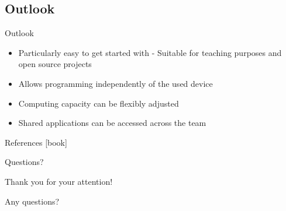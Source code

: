 \documentclass{beamer}
\begin{document}
\subsection{Outlook}
\begin{frame}{Outlook}
  \begin{itemize}
    \large
    \setlength\itemsep{0.6em}
    \item Particularly easy to get started with - Suitable for teaching purposes and open source projects
    \item Allows programming independently of the used device
    \item Computing capacity can be flexibly adjusted
    \item Shared applications can be accessed across the team
  \end{itemize}
\end{frame}


\appendix
\begin{frame}[allowframebreaks]{References}
  \small
  [book]
  {}
  
\end{frame}

\begin{frame}{Questions?}
  \begin{center}
    Thank you for your attention!

    Any questions?
  \end{center}
\end{frame}
\end{document}
